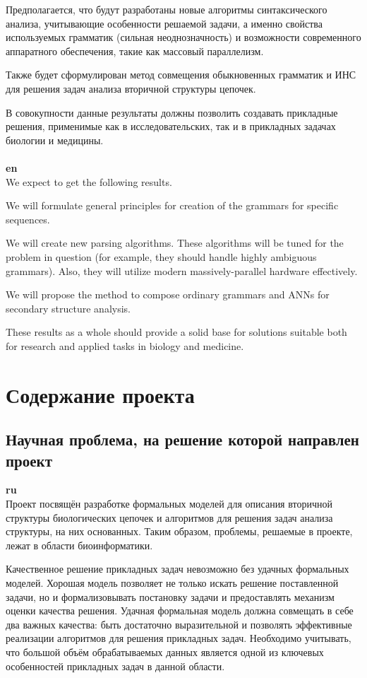 \documentclass[12pt]{article}  %
\theoremstyle{remark}
\begin{document}
Предполагается, что будут разработаны новые алгоритмы синтаксического анализа, учитывающие особенности решаемой задачи, а именно свойства используемых грамматик (сильная неоднозначность) и возможности современного аппаратного обеспечения, такие как массовый параллелизм.

Также будет сформулирован метод совмещения обыкновенных грамматик и ИНС для решения задач анализа вторичной структуры цепочек.

В совокупности данные результаты должны позволить создавать прикладные решения, применимые как в исследовательских, так и в прикладных задачах биологии и медицины.
\\
\\
\textbf{en}\\
We expect to get the following results.

We will formulate general principles for creation of the grammars for specific sequences.

We will create new parsing algorithms. These algorithms will be tuned for the  problem in question (for example, they should handle highly ambiguous grammars). Also, they will utilize modern massively-parallel hardware effectively.

We will propose the method to compose ordinary grammars and ANNs for secondary structure analysis.

These results as a whole should provide a solid base for solutions suitable both for research and applied tasks in biology and medicine.

\section{Содержание проекта}

\subsection{Научная проблема, на решение которой направлен проект}

\textbf{ru}\\
Проект посвящён разработке формальных моделей для описания вторичной структуры биологических цепочек и алгоритмов для решения задач анализа структуры, на них основанных. Таким образом, проблемы, решаемые в проекте, лежат в области биоинформатики.

Качественное решение прикладных задач невозможно без удачных формальных моделей. Хорошая модель позволяет не только искать решение поставленной задачи, но и формализовывать постановку задачи и предоставлять механизм оценки качества решения.
Удачная формальная модель должна совмещать в себе два важных качества: быть достаточно выразительной и позволять эффективные реализации алгоритмов для решения прикладных задач.
Необходимо учитывать, что большой объём обрабатываемых данных является одной из ключевых особенностей прикладных задач в данной области.
\end{document}
